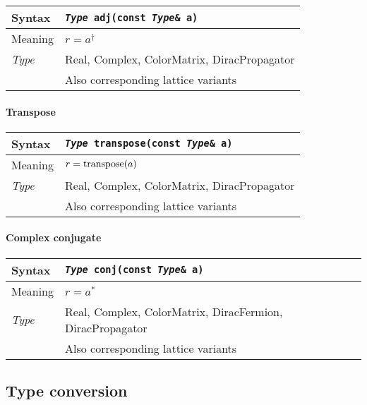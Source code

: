 \documentclass[12pt,letterpaper]{article}
\newcommand{\tReal}{Real}
\newcommand{\tComplex}{Complex}
\newcommand{\tColorMatrix}{ColorMatrix}
\newcommand{\tDiracFermion}{DiracFermion}
\newcommand{\tDiracPropagator}{DiracPropagator}
\newcommand{\simLatticeVariants}{Also corresponding lattice variants}
\newcommand{\itt}{\it Type}
\newcommand{\protoUnaryQual}[1]{{\tt {\it Type} #1(const {\it Type}\& a)}}
\begin{document}
\begin{flushleft}
  \begin{tabular}{|l|l|}
  \hline
  Syntax      & \protoUnaryQual{\tt adj}  \\
  \hline
  Meaning     & $r = a^\dagger$ \\
  \hline
  \itt        & \tReal, \tComplex, \tColorMatrix, \tDiracPropagator \\
              & \simLatticeVariants \\
  \hline
  \end{tabular}
\end{flushleft}

\paragraph{Transpose}

\begin{flushleft}
  \begin{tabular}{|l|l|}
  \hline
  Syntax      & \protoUnaryQual{\tt transpose}  \\
  \hline
  Meaning     & $r = {\rm transpose}(a)$ \\
  \hline
  \itt        & \tReal, \tComplex, \tColorMatrix, \tDiracPropagator \\
              & \simLatticeVariants \\
  \hline
  \end{tabular}
\end{flushleft}

\paragraph{Complex conjugate}

\begin{flushleft}
  \begin{tabular}{|l|l|}
  \hline
  Syntax      & \protoUnaryQual{\tt conj}  \\
  \hline
  Meaning     & $r = a^*$ \\
  \hline
  \itt        & \tReal, \tComplex, \tColorMatrix, \tDiracFermion, \tDiracPropagator \\
              & \simLatticeVariants \\
  \hline
  \end{tabular}
\end{flushleft}

\subsection{Type conversion}
\end{document}
